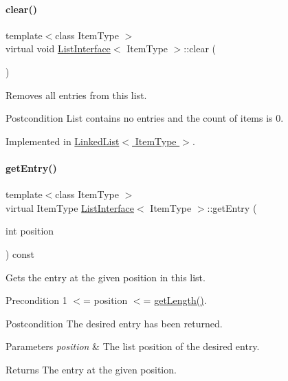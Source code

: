 \paragraph{\texorpdfstring{clear()}{clear()}}
{\footnotesize\ttfamily template$<$class Item\+Type $>$ \\
virtual void \hyperlink{class_list_interface}{List\+Interface}$<$ Item\+Type $>$\+::clear (\begin{DoxyParamCaption}{ }\end{DoxyParamCaption})\hspace{0.3cm}{\ttfamily [pure virtual]}}

Removes all entries from this list. \begin{DoxyPostcond}{Postcondition}
List contains no entries and the count of items is 0. 
\end{DoxyPostcond}


Implemented in \hyperlink{class_linked_list_a7d1d9cf83eef67b6c4d700a3cc5970e1}{Linked\+List$<$ Item\+Type $>$}.

\hypertarget{class_list_interface_a86987f69e5056d287212ede41db1956a}{}\label{class_list_interface_a86987f69e5056d287212ede41db1956a} 
\paragraph{\texorpdfstring{get\+Entry()}{getEntry()}}
{\footnotesize\ttfamily template$<$class Item\+Type $>$ \\
virtual Item\+Type \hyperlink{class_list_interface}{List\+Interface}$<$ Item\+Type $>$\+::get\+Entry (\begin{DoxyParamCaption}\item[{int}]{position }\end{DoxyParamCaption}) const\hspace{0.3cm}{\ttfamily [pure virtual]}}

Gets the entry at the given position in this list. \begin{DoxyPrecond}{Precondition}
1 $<$= position $<$= \hyperlink{class_list_interface_afc85695d4137f1e29ff02e179c9f3221}{get\+Length()}. 
\end{DoxyPrecond}
\begin{DoxyPostcond}{Postcondition}
The desired entry has been returned. 
\end{DoxyPostcond}

\begin{DoxyParams}{Parameters}
{\em position} & The list position of the desired entry. \\
\hline
\end{DoxyParams}
\begin{DoxyReturn}{Returns}
The entry at the given position. 
\end{DoxyReturn}


